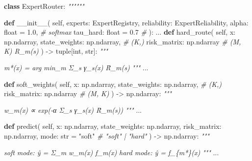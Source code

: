 \documentclass[
  12pt,
]{article}
\newenvironment{Shaded}{}{}
\newcommand{\BuiltInTok}[1]{\textcolor[rgb]{0.00,0.50,0.00}{#1}}
\newcommand{\CommentTok}[1]{\textcolor[rgb]{0.38,0.63,0.69}{\textit{#1}}}
\newcommand{\FloatTok}[1]{\textcolor[rgb]{0.25,0.63,0.44}{#1}}
\newcommand{\FunctionTok}[1]{\textcolor[rgb]{0.02,0.16,0.49}{#1}}
\newcommand{\KeywordTok}[1]{\textcolor[rgb]{0.00,0.44,0.13}{\textbf{#1}}}
\newcommand{\NormalTok}[1]{#1}
\newcommand{\OperatorTok}[1]{\textcolor[rgb]{0.40,0.40,0.40}{#1}}
\newcommand{\StringTok}[1]{\textcolor[rgb]{0.25,0.44,0.63}{#1}}
\newcommand{\VariableTok}[1]{\textcolor[rgb]{0.10,0.09,0.49}{#1}}
\begin{document}
\begin{Shaded}
\begin{Highlighting}[]
\KeywordTok{class}\NormalTok{ ExpertRouter:}
    \CommentTok{""""""}

    \KeywordTok{def} \FunctionTok{\_\_init\_\_}\NormalTok{(}
        \VariableTok{self}\NormalTok{,}
\NormalTok{        experts: ExpertRegistry,}
\NormalTok{        reliability: ExpertReliability,}
\NormalTok{        alpha: }\BuiltInTok{float} \OperatorTok{=} \FloatTok{1.0}\NormalTok{,       }\CommentTok{\#  softmax }
\NormalTok{        tau\_hard: }\BuiltInTok{float} \OperatorTok{=} \FloatTok{0.7}     \CommentTok{\# }
\NormalTok{    ):}
\NormalTok{        ...}
    \KeywordTok{def}\NormalTok{ hard\_route(}
        \VariableTok{self}\NormalTok{,}
\NormalTok{        x: np.ndarray,}
\NormalTok{        state\_weights: np.ndarray,     }\CommentTok{\# (K,) }
\NormalTok{        risk\_matrix: np.ndarray        }\CommentTok{\# (M, K)  R\_m(s)}
\NormalTok{    ) }\OperatorTok{{-}\textgreater{}} \BuiltInTok{tuple}\NormalTok{[}\BuiltInTok{int}\NormalTok{, }\BuiltInTok{str}\NormalTok{]:}
        \CommentTok{"""}

\CommentTok{        m*(x) = arg min\_m Σ\_s γ\_s(x)  R̂\_m(s)}
\CommentTok{        """}
\NormalTok{        ...}

    \KeywordTok{def}\NormalTok{ soft\_weights(}
        \VariableTok{self}\NormalTok{,}
\NormalTok{        x: np.ndarray,}
\NormalTok{        state\_weights: np.ndarray,     }\CommentTok{\# (K,)}
\NormalTok{        risk\_matrix: np.ndarray        }\CommentTok{\# (M, K)}
\NormalTok{    ) }\OperatorTok{{-}\textgreater{}}\NormalTok{ np.ndarray:}
        \CommentTok{"""}

\CommentTok{        w\_m(x) ∝ exp({-}α  Σ\_s γ\_s(x)  R̂\_m(s))}
\CommentTok{        """}
\NormalTok{        ...}

    \KeywordTok{def}\NormalTok{ predict(}
        \VariableTok{self}\NormalTok{,}
\NormalTok{        x: np.ndarray,}
\NormalTok{        state\_weights: np.ndarray,}
\NormalTok{        risk\_matrix: np.ndarray,}
\NormalTok{        mode: }\BuiltInTok{str} \OperatorTok{=} \StringTok{"soft"}             \CommentTok{\# "soft" | "hard"}
\NormalTok{    ) }\OperatorTok{{-}\textgreater{}}\NormalTok{ np.ndarray:}
        \CommentTok{"""}

\CommentTok{        soft mode: ŷ = Σ\_m w\_m(x)  f\_m(x)}
\CommentTok{        hard mode: ŷ = f\_\{m*\}(x)}
\CommentTok{        """}
\NormalTok{        ...}
\end{Highlighting}
\end{Shaded}
\end{document}
